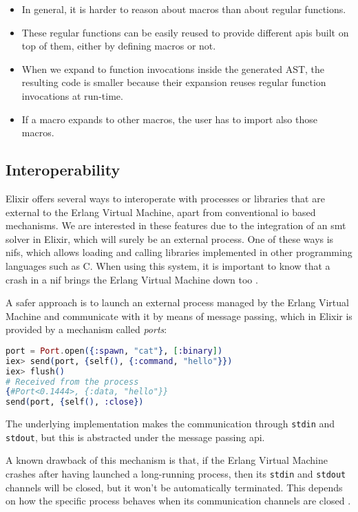 \begin{itemize}
  \item In general, it is harder to reason about macros than about regular functions.
  \item These regular functions can be easily reused to provide different \gls{api}s built on top of them, either by defining macros or not.
  \item When we expand to function invocations inside the generated AST, the resulting code is smaller because their expansion reuses regular function invocations at run-time.
  \item If a macro expands to other macros, the user has to import also those macros.
\end{itemize}

\subsection{Interoperability}

Elixir offers several ways to interoperate with processes or libraries that are
external to the Erlang Virtual Machine, apart from conventional \gls{io} based
mechanisms. We are interested in these features due to the integration of an
\acrshort{smt} solver in Elixir, which will surely be an external process. One
of these ways is \gls{nif}s, which allows loading and calling libraries
implemented in other programming languages such as C. When using this system, it
is important to know that a crash in a \gls{nif} brings the Erlang Virtual 
Machine down too \citep{ErlangDocs}.

A safer approach is to launch an external process managed by the Erlang Virtual
Machine and communicate with it by means of message passing, which in Elixir is
provided by a mechanism called \textit{ports}:

\begin{lstlisting}[language=elixir,numbers=none,frame=none]
port = Port.open({:spawn, "cat"}, [:binary])
iex> send(port, {self(), {:command, "hello"}})
iex> flush()
# Received from the process
{#Port<0.1444>, {:data, "hello"}} 
send(port, {self(), :close})
\end{lstlisting}

The underlying implementation makes the communication through \verb|stdin| and 
\verb|stdout|, but this is abstracted under the message passing \gls{api}.

A known drawback of this mechanism is that, if the Erlang Virtual Machine
crashes after having launched a long-running process, then its \verb|stdin| and
\verb|stdout| channels will be closed, but it won't be automatically terminated.
This depends on how the specific process behaves when its communication channels
are closed \citep{ElixirDocs}.

